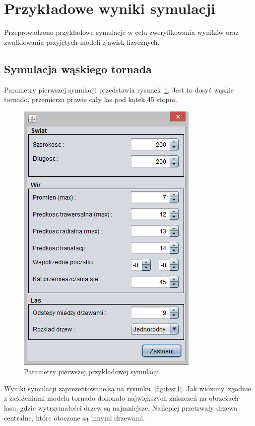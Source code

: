 \section{Przykładowe wyniki symulacji}

Przeprowadzono przykładowe symulacje w celu zweryfikowania wyników oraz zwalidowania przyjętych modeli zjawisk fizycznych.
\subsection{Symulacja wąskiego tornada}

Parametry pierwszej symulacji przedstawia rysunek~\ref{fig:test1p}. Jest to dosyć wąskie tornado, przemierza prawie cały las pod kątek 45 stopni.

\begin{figure}[!h]
	\center
	\includegraphics[scale=0.7]{test1p}
	\caption{Parametry pierwszej przykładowej symulacji.}
	\label{fig:test1p}
\end{figure} 

Wyniki symulacji zaprezentowane są na rysunku~\ref{fig:test1}. Jak widzimy, zgodnie z założeniami modelu tornado dokonało największych zniszczeń na obrzeżach lasu, gdzie wytrzymałości drzew są najmniejsze. Najlepiej przetrwały drzewa centralne, które otoczone są innymi drzewami.

